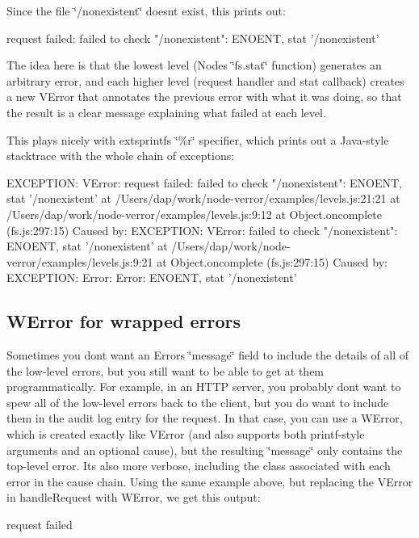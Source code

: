 Since the file \char`\"{}/nonexistent\char`\"{} doesn\textquotesingle{}t exist, this prints out\+: \begin{DoxyVerb}request failed: failed to check "/nonexistent": ENOENT, stat '/nonexistent'
\end{DoxyVerb}


The idea here is that the lowest level (Node\textquotesingle{}s \char`\"{}fs.\+stat\char`\"{} function) generates an arbitrary error, and each higher level (request handler and stat callback) creates a new V\+Error that annotates the previous error with what it was doing, so that the result is a clear message explaining what failed at each level.

This plays nicely with extsprintf\textquotesingle{}s \char`\"{}\%r\char`\"{} specifier, which prints out a Java-\/style stacktrace with the whole chain of exceptions\+: \begin{DoxyVerb}EXCEPTION: VError: request failed: failed to check "/nonexistent": ENOENT, stat '/nonexistent'
    at /Users/dap/work/node-verror/examples/levels.js:21:21
    at /Users/dap/work/node-verror/examples/levels.js:9:12
    at Object.oncomplete (fs.js:297:15)
Caused by: EXCEPTION: VError: failed to check "/nonexistent": ENOENT, stat '/nonexistent'
    at /Users/dap/work/node-verror/examples/levels.js:9:21
    at Object.oncomplete (fs.js:297:15)
Caused by: EXCEPTION: Error: Error: ENOENT, stat '/nonexistent'
\end{DoxyVerb}


\subsection*{W\+Error for wrapped errors}

Sometimes you don\textquotesingle{}t want an Error\textquotesingle{}s \char`\"{}message\char`\"{} field to include the details of all of the low-\/level errors, but you still want to be able to get at them programmatically. For example, in an H\+T\+TP server, you probably don\textquotesingle{}t want to spew all of the low-\/level errors back to the client, but you do want to include them in the audit log entry for the request. In that case, you can use a W\+Error, which is created exactly like V\+Error (and also supports both printf-\/style arguments and an optional cause), but the resulting \char`\"{}message\char`\"{} only contains the top-\/level error. It\textquotesingle{}s also more verbose, including the class associated with each error in the cause chain. Using the same example above, but replacing the V\+Error in handle\+Request with W\+Error, we get this output\+: \begin{DoxyVerb}request failed
\end{DoxyVerb}


